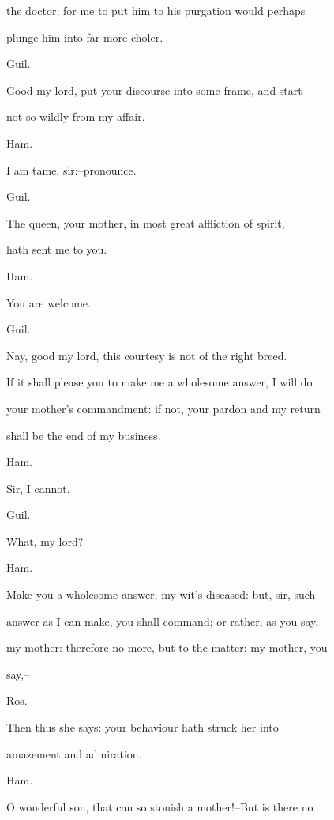 \documentclass[12pt]{book}
\begin{document}
the doctor; for me to put him to his purgation would perhaps

plunge him into far more choler.



Guil.

Good my lord, put your discourse into some frame, and start

not so wildly from my affair.



Ham.

I am tame, sir:--pronounce.



Guil.

The queen, your mother, in most great affliction of spirit,

hath sent me to you.



Ham.

You are welcome.



Guil.

Nay, good my lord, this courtesy is not of the right breed.

If it shall please you to make me a wholesome answer, I will do

your mother's commandment: if not, your pardon and my return

shall be the end of my business.



Ham.

Sir, I cannot.



Guil.

What, my lord?



Ham.

Make you a wholesome answer; my wit's diseased: but, sir, such

answer as I can make, you shall command; or rather, as you say,

my mother: therefore no more, but to the matter: my mother, you

say,--



Ros.

Then thus she says: your behaviour hath struck her into

amazement and admiration.



Ham.

O wonderful son, that can so stonish a mother!--But is there no
\end{document}
